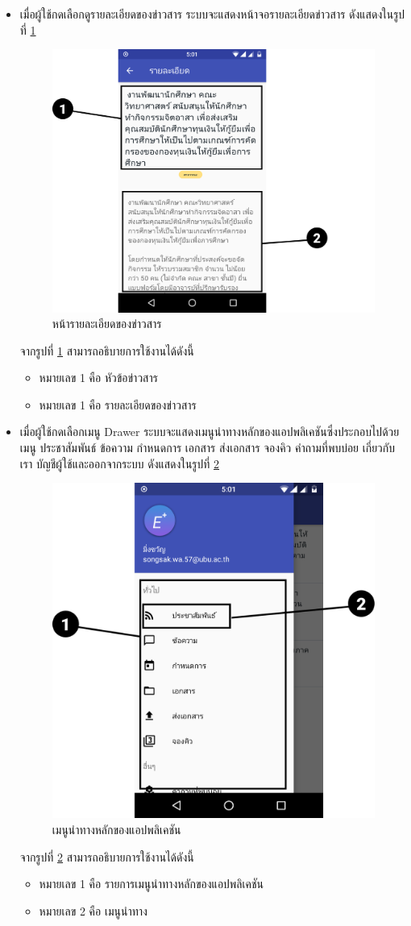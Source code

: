 \begin{enumerate}
\begin{itemize}
			\item เมื่อผู้ใช้กดเลือกดูรายละเอียดของข่าวสาร ระบบจะแสดงหน้าจอรายละเอียดข่าวสาร ดังแสดงในรูปที่ \ref{Fig:viewpost}
			\begin{figure}[H]
				\centering
				\includegraphics[width=0.5\columnwidth]{Figures/7/Manual/viewpost}
				\caption{หน้ารายละเอียดของข่าวสาร}
				\label{Fig:viewpost}
			\end{figure}
			จากรูปที่ \ref{Fig:viewpost} สามารถอธิบายการใช้งานได้ดังนี้
			\begin{itemize}[label={--}]
				\item หมายเลข 1 คือ หัวข้อข่าวสาร
				\item หมายเลข 1 คือ รายละเอียดของข่าวสาร
			\end{itemize}
		
			\item เมื่อผู้ใช้กดเลือกเมนู Drawer ระบบจะแสดงเมนูนำทางหลักของแอปพลิเคชันซึ่งประกอบไปด้วยเมนู ประชาสัมพันธ์ ข้อความ กำหนดการ เอกสาร ส่งเอกสาร จองคิว คำถามที่พบบ่อย เกี่ยวกับเรา บัญชีผู้ใช้และออกจากระบบ ดังแสดงในรูปที่ \ref{Fig:nav}
			\begin{figure}[H]
				\centering
				\includegraphics[width=0.5\columnwidth]{Figures/7/Manual/nav}
				\caption{เมนูนำทางหลักของแอปพลิเคชัน}
				\label{Fig:nav}
			\end{figure}
			จากรูปที่ \ref{Fig:nav} สามารถอธิบายการใช้งานได้ดังนี้
			\begin{itemize}[label={--}]
				\item หมายเลข 1 คือ รายการเมนูนำทางหลักของแอปพลิเคชัน
				\item หมายเลข 2 คือ เมนูนำทาง
			\end{itemize}
		

\end{itemize}
\end{enumerate}

